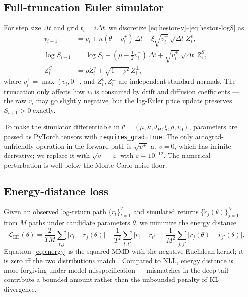 \documentclass[11pt]{article}
\begin{document}
\subsection{Full-truncation Euler simulator}

For step size $\Delta t$ and grid $t_i = i \Delta t$, we discretize
\eqref{eq:heston-v}--\eqref{eq:heston-logS} as
\begin{align}
  v_{i+1} &= v_i + \kappa(\theta - v_i^+)\, \Delta t + \xi \sqrt{v_i^+}\, \sqrt{\Delta t}\, Z_i^v, \\
  \log S_{i+1} &= \log S_i + (\mu - \tfrac{1}{2} v_i^+)\, \Delta t
                + \sqrt{v_i^+}\, \sqrt{\Delta t}\, Z_i^S, \\
  Z_i^S &= \rho Z_i^v + \sqrt{1 - \rho^2}\, Z_i^\perp,
\end{align}
where $v_i^+ = \max(v_i, 0)$, and $Z_i^v, Z_i^\perp$ are independent standard
normals. The truncation only affects how $v_i$ is consumed by drift and
diffusion coefficients --- the raw $v_i$ may go slightly negative, but the
log-Euler price update preserves $S_{i+1} > 0$ exactly.

To make the simulator differentiable in $\theta = (\mu, \kappa, \theta_{\!H},
\xi, \rho, v_0)$, parameters are passed as PyTorch tensors with
\texttt{requires\_grad=True}. The only autograd-unfriendly operation in the
forward path is $\sqrt{v^+}$ at $v = 0$, which has infinite derivative; we
replace it with $\sqrt{v^+ + \varepsilon}$ with $\varepsilon = 10^{-12}$. The
numerical perturbation is well below the Monte Carlo noise floor.

\subsection{Energy-distance loss}

Given an observed log-return path $\{r_t\}_{t=1}^{T}$ and simulated returns
$\{\tilde r_j(\theta)\}_{j=1}^{M}$ from $M$ paths under candidate parameters
$\theta$, we minimize the energy distance
\begin{equation}
  \mathcal{L}_{\mathrm{ED}}(\theta)
  = \frac{2}{TM}\sum_{t,j} \lvert r_t - \tilde r_j(\theta) \rvert
  - \frac{1}{T^2}\sum_{t,t'} \lvert r_t - r_{t'} \rvert
  - \frac{1}{M^2}\sum_{j,j'} \lvert \tilde r_j(\theta) - \tilde r_{j'}(\theta) \rvert.
  \label{eq:energy}
\end{equation}
Equation~\eqref{eq:energy} is the squared MMD with the negative-Euclidean
kernel; it is zero iff the two distributions match \cite{szekely2013energy,
gretton2012mmd}. Compared to NLL, energy distance is more forgiving under
model misspecification --- mismatches in the deep tail contribute a bounded
amount rather than the unbounded penalty of KL divergence.
\end{document}
